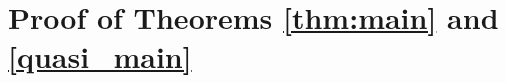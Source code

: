 \documentclass{article}
\newtheorem{thm}{Theorem}[section]
\theoremstyle{definition}
\theoremstyle{remark}
\newtheorem{rem}[thm]{Remark}
\numberwithin{equation}{section}
\newcommand{\X}{\mathcal{X}}
\newcommand{\R}{\mathbb{R}}
\newcommand{\N}{\mathbb{N}}
\newcommand{\lammin}{\lambda_{\textup{min}}}
\newcommand{\norm}[2]{
    \|#1\|_{#2}
}
\begin{document}

\section{Proof of Theorems \ref{thm:main} and \ref{quasi_main}}
\label{ap:proof_1}
\end{document}
